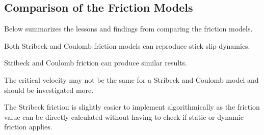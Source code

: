 \subsection{Comparison of the Friction Models}
Below summarizes the lessons and findings from comparing the friction models.
\begin{bulletedlist}
	\item Both Stribeck and Coulomb friction models can reproduce stick slip dynamics.
	\item Stribeck and Coulomb friction can produce similar results.
	\item The critical velocity may not be the same for a Stribeck and Coulomb model and should be investigated more.
	\item The Stribeck friction is slightly easier to implement algorithmically as the friction value can be directly calculated without having to check if static or dynamic friction applies.
\end{bulletedlist}